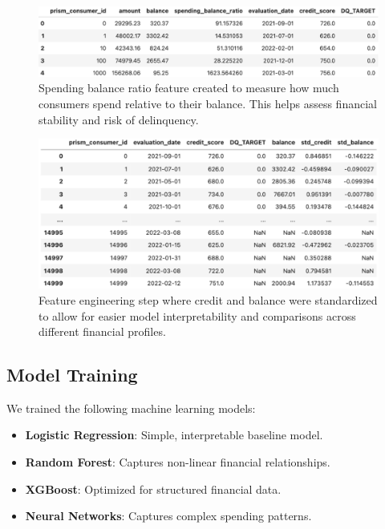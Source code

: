 \documentclass[12pt,letterpaper]{article}
\begin{document}
\begin{figure}[H]
    \centering
    \includegraphics[width=\textwidth]{figure/spending_balance_ratio.png}
    \caption{Spending balance ratio feature created to measure how much consumers spend relative to their balance. This helps assess financial stability and risk of delinquency.}
    \label{fig:spending_balance_ratio}
\end{figure}

\begin{figure}[H]
    \centering
    \includegraphics[width=\textwidth]
    {figure/standardized_credit_balance.png}
    \caption{Feature engineering step where credit and balance were standardized to allow for easier model interpretability and comparisons across different financial profiles.}
    \label{fig:standardized_credit_balance}
\end{figure}

\subsection{Model Training}
We trained the following machine learning models:
\begin{itemize}
    \item \textbf{Logistic Regression}: Simple, interpretable baseline model.
    \item \textbf{Random Forest}: Captures non-linear financial relationships.
    \item \textbf{XGBoost}: Optimized for structured financial data.
    \item \textbf{Neural Networks}: Captures complex spending patterns.
\end{itemize}
\end{document}
